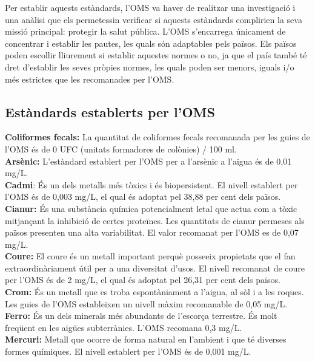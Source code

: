 Per establir aquests estàndards, l'OMS va haver de realitzar una investigació i una anàlisi que els permetessin verificar si aquests estàndards complirien la seva missió principal: protegir la salut pública. L'OMS s’encarrega únicament de concentrar i establir les pautes, les quals són adaptables pels països. Els països poden escollir lliurement si establir aquestes normes o no, ja que el país també té dret d’establir les seves pròpies normes, les quals poden ser menors, iguals i/o més estrictes que les recomanades per l'OMS.
\subsection*{Estàndards establerts per l’OMS}


\textbf{Coliformes fecals:} La quantitat de coliformes fecals recomanada per les guies de l’OMS és de 0 UFC (unitats formadores de colònies) / 100 ml.\\

\textbf{Arsènic:} L’estàndard establert per l’OMS per a l’arsènic a l’aigua és de 0,01 mg/L.\\

\textbf{Cadmi}: És un dels metalls més tòxics i és biopersistent. El nivell establert per l’OMS és de 0,003 mg/L, el qual és adoptat pel 38,88 per cent dels països. \\

\textbf{Cianur:} És una substància química potencialment letal que actua com a tòxic mitjançant la inhibició de certes proteïnes. Les quantitats de cianur permeses als països presenten una alta variabilitat. El valor recomanat per l'OMS es de 0,07 mg/L.\\

\textbf{Coure:}  El coure és un metall important perquè posseeix propietats que el fan extraordinàriament útil per a una diversitat d’usos. El nivell recomanat de coure per l’OMS és de 2 mg/L, el qual és adoptat pel 26,31 per cent dels països.\\

\textbf{Crom:} És un metall que es troba espontàniament a l’aigua, al sòl i a les roques. Les guies de l’OMS estableixen un nivell màxim recomanable de 0,05 mg/L.\\

\textbf{Ferro:} És un dels minerals més abundants de l’escorça terrestre. És molt freqüent en les aigües subterrànies. L’OMS recomana 0,3 mg/L.\\

\textbf{Mercuri:} Metall que ocorre de forma natural en l’ambient i que té diverses formes químiques. El nivell establert per l’OMS és de 0,001 mg/L.\\

